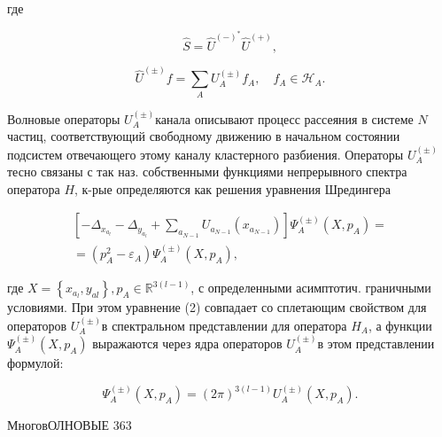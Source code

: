 \documentclass[10pt]{article}
\begin{document}
где



\[

\hat{S}=\hat{U}^{(-)^{*}} \hat{U}^{(+)},

\]



\[

\hat{U}^{( \pm)} f=\sum_{A} U_{A}^{( \pm)} f_{A}, \quad f_{A} \in \mathscr{H}_{A} .

\]



Волновые операторы $U_{A}^{( \pm)}$канала описывают процесс рассеяния в системе $N$ частиц, соответствующий свободному движению в начальном состоянии подсистем отвечающего этому каналу кластерного разбиения. Операторы $U_{A}^{( \pm)}$тесно связаны с так наз. собственными функциями непрерывного спектра оператора $H$, к-рые определяются как решения уравнения Шредингера



\[

\begin{gathered}

{\left[-\Delta_{x_{a_{l}}}-\Delta_{y_{a_{l}}}+\sum_{a_{N-1}} U_{a_{N-1}}\left(x_{a_{N-1}}\right)\right] \Psi_{A}^{( \pm)}\left(X, p_{A}\right)=} \\

=\left(p_{A}^{2}-\varepsilon_{A}\right) \Psi_{A}^{( \pm)}\left(X, p_{A}\right),

\end{gathered}

\]



где $X=\left\{x_{a_{l}}, y_{a l}\right\}, p_{A} \in \mathbb{R}^{3(l-1)}$, с определенными асимптотич. граничными условиями. При этом уравнение (2) совпадает со сплетающим свойством для операторов $U_{A}^{( \pm)}$в спектральном представлении для оператора $H_{A}$, а функции $\Psi_{A}^{( \pm)}\left(X, p_{A}\right)$ выражаются через ядра операторов $U_{A}^{( \pm)}$в этом представлении формулой:



\[

\Psi_{A}^{( \pm)}\left(X, p_{A}\right)=(2 \pi)^{3(l-1)} U_{A}^{( \pm)}\left(X, p_{A}\right) .

\]



МноговОЛНОВЫЕ 363
\end{document}

